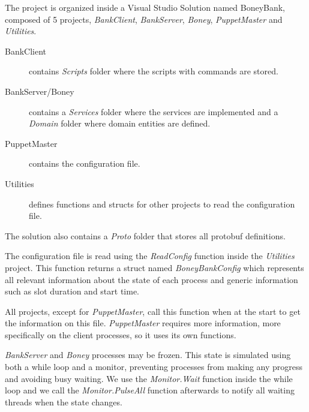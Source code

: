\documentclass[times, 10pt,twocolumn]{article}
\begin{document}
The project is organized inside a Visual Studio Solution named BoneyBank, composed of 5 projects, \textit{BankClient}, \textit{BankServer}, \textit{Boney}, \textit{PuppetMaster} and \textit{Utilities}.
\begin{description}
   \item[BankClient] contains \textit{Scripts} folder where the scripts with commands are stored.
   \item[BankServer/Boney] contains a \textit{Services} folder where the services are implemented and a \textit{Domain} folder where domain entities are defined.
   \item[PuppetMaster] contains the configuration file.
   \item[Utilities] defines functions and structs for other projects to read the configuration file.
\end{description}
The solution also contains a \textit{Proto} folder that stores all protobuf definitions.

The configuration file is read using the \textit{ReadConfig} function inside the \textit{Utilities} project. This function returns a struct named \textit{BoneyBankConfig} which represents all relevant information about the state of each process and generic information such as slot duration and start time.

All projects, except for \textit{PuppetMaster}, call this function when at the start to get the information on this file. \textit{PuppetMaster} requires more information, more specifically on the client processes, so it uses its own functions.



\textit{BankServer} and \textit{Boney} processes may be frozen. This state is simulated using both a while loop and a monitor, preventing processes from making any progress and avoiding busy waiting. We use the \textit{Monitor.Wait} function inside the while loop and we call the \textit{Monitor.PulseAll} function afterwards to notify all waiting threads when the state changes.

\end{document}
